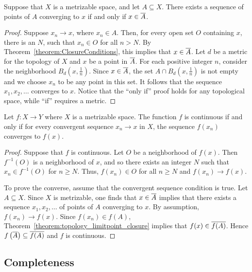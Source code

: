 \begin{theorem}
Suppose that $X$ is a metrizable space, and let $A \subseteq X$.
There exists a sequence of points of $A$ converging to $x$ if and only if $x \in \overline{A}$.
\end{theorem}
\begin{proof}
Suppose $x_n \rightarrow x$, where $x_n \in A$.
Then, for every open set $O$ containing $x$, there is an $N$, such that $x_n \in O$ for all $n>N$.
By Theorem~\ref{theorem:ClosureConditions}, this implies that $x \in \overline{A}$.
Let $d$ be a metric for the topology of $X$ and $x$ be a point in $\overline{A}$.
For each positive integer $n$, consider the neighborhood $B_d \left( x, \frac{1}{n} \right)$.
Since $x\in \overline{A}$, the set $A \cap B_d \left( x, \frac{1}{n} \right)$ is not empty and we choose $x_n$ to be any point in this set.
It follows that the sequence $x_1, x_2, \ldots$ converges to $x$.
Notice that the ``only if'' proof holds for any topological space, while ``if'' requires a metric.
\end{proof}

\begin{theorem}
\label{theorem:topology_limitpoint_closure}
Let $f: X \rightarrow Y$ where $X$ is a metrizable space.
The function $f$ is continuous if and only if for every convergent sequence $x_n \rightarrow x$ in $X$, the sequence $f(x_n)$ converges to $f(x)$.
\end{theorem}
\begin{proof}
Suppose that $f$ is continuous.
Let $O$ be a neighborhood of $f(x)$.
Then $f^{-1}(O)$ is a neighborhood of $x$, and so there exists an integer $N$ such that $x_n \in f^{-1}(O)$ for $n \geq N$.
Thus, $f(x_n) \in O$ for all $n \geq N$ and $f(x_n) \rightarrow f(x)$.

To prove the converse, assume that the convergent sequence condition is true.
Let $A \subseteq X$.
Since $X$ is metrizable, one finds that $x \in \overline{A}$ implies that there exists a sequence $x_1, x_2, \ldots$ of points of $A$ converging to $x$.
By assumption, $f(x_n) \rightarrow f(x)$.
Since $f(x_n) \in f(A)$, Theorem~\ref{theorem:topology_limitpoint_closure} implies that $f(x) \in \overline{f(A)}$.
Hence $f \left( \overline{A} \right) \subseteq \overline{f(A)}$ and $f$ is continuous.
\end{proof}


\subsection{Completeness}

